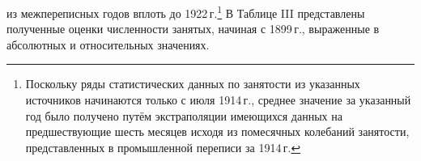 \documentclass[leqno]{article}  %
\begin{document}
из межпереписных годов вплоть до 1922\,г.\footnote{Поскольку ряды статистических данных по занятости из указанных источников начинаются только с июля 1914\,г., среднее значение за указанный год было получено путём экстраполяции имеющихся данных на предшествующие шесть месяцев исходя из помесячных колебаний занятости, представленных в промышленной переписи за 1914\,г.} В Таблице III представлены полученные оценки численности занятых, начиная с 1899\,г., выраженные в абсолютных и относительных значениях.

\end{document}
